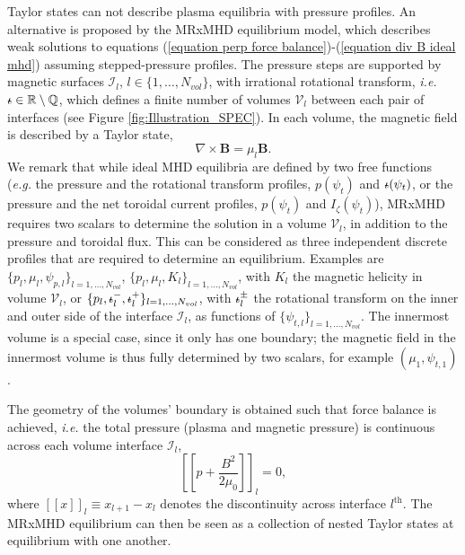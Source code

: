 \documentclass[my_thesis.tex]{subfiles}
\begin{document}
Taylor states can not describe plasma equilibria with pressure profiles. An alternative is proposed by the MRxMHD equilibrium model, which describes weak solutions to equations (\ref{equation perp force balance})-(\ref{equation div B ideal mhd}) assuming stepped-pressure profiles. The pressure steps are supported by magnetic surfaces $\mathcal{I}_l$, $l\in\{1,\ldots,N_{vol}\}$, with irrational rotational transform, \textit{i.e.} $\text{$\iota\!\!$-}\in\mathbb{R}\setminus\mathbb{Q}$, which defines a finite number of volumes $\mathcal{V}_l$ between each pair of interfaces (see Figure \ref{fig:Illustration_SPEC}). In each volume, the magnetic field is described by a Taylor state, 
\begin{equation}
	\nabla\times\mathbf{B}=\mu_l\mathbf{B}. \label{eq.BeltramiEquation}
\end{equation}
We remark that while ideal \ac{MHD} equilibria are defined by two free functions (\textit{e.g.} the pressure and the rotational transform profiles, $p(\psi_t)$ and $\text{$\iota\!\!$-}(\psi_t)$, or the pressure and the net toroidal current profiles, $p(\psi_t)$ and $I_\zeta(\psi_t)$), \ac{MRxMHD} requires two scalars to determine the solution in a volume $\mathcal{V}_l$, in addition to the pressure and toroidal flux. This can be considered as three independent discrete profiles that are required to determine an equilibrium. Examples are $\{p_l, \mu_l, \psi_{p,l}\}_{l=1,\ldots,N_{vol}}$, $\{p_l, \mu_l, K_l\}_{l=1,\ldots,N_{vol}}$, with $K_l$ the magnetic helicity in volume $\mathcal{V}_l$, or $\{p_l,\text{$\iota\!\!$-}^-_l,\text{$\iota\!\!$-}^+_l\}_{l=1,\ldots,N_{vol}}$, with $\text{$\iota\!\!$-}^\pm_l$ the rotational transform on the inner and outer side of the interface $\mathcal{I}_l$, as functions of $\{\psi_{t,l}\}_{l=1,\ldots,N_{vol}}$. The innermost volume is a special case, since it only has one boundary; the magnetic field in the innermost volume is thus fully determined by two scalars, for example $(\mu_1,\psi_{t,1})$.

The geometry of the volumes' boundary is obtained such that force balance is achieved, \textit{i.e.} the total pressure (plasma and magnetic pressure) is continuous across each volume interface $\mathcal{I}_l$,
\begin{equation}
	\left[\left[p + \frac{B^2}{2\mu_0}\right]\right]_l = 0, \label{eq.force_balance}
\end{equation}
where $[[x]]_l\equiv x_{l+1}-x_l$ denotes the discontinuity across interface $l^{\text{th}}$. The MRxMHD equilibrium can then be seen as a collection of nested Taylor states at equilibrium with one another. 
\end{document}

